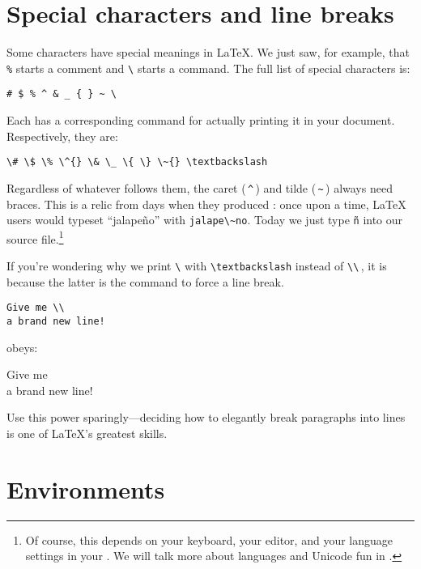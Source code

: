 \section{Special characters and line breaks}

Some characters have special meanings in \LaTeX.
We just saw, for example, that \verb|%| starts a comment
and \verb|\| starts a command.
The full list of special characters is:
\begin{leftfigure}
\begin{lstlisting}
# $ % ^ & _ { } ~ \
\end{lstlisting}
\end{leftfigure}
Each has a corresponding command
for actually printing it in your document. Respectively, they are:
\begin{leftfigure}
\begin{lstlisting}
\# \$ \% \^{} \& \_ \{ \} \~{} \textbackslash
\end{lstlisting}
\end{leftfigure}
Regardless of whatever follows them,
the caret (\,\texttt{\^{}}\,) and tilde (\,\texttt{\~{}}\,) always need braces.
This is a relic from days when they produced :
once upon a time, \LaTeX{} users would typeset ``jalapeño'' with
\verb|jalape\~no|.
Today we just type \texttt{ñ} into our source
file.\punckern\footnote{Of course, this depends
on your keyboard, your editor, and your language settings in your .
We will talk more about languages and Unicode fun in .}

If you're wondering why we print \texttt{\textbackslash} with
\verb|\textbackslash| instead of \verb|\\|\,,
it is because the latter is the command to force a line break.
\begin{leftfigure}
\begin{lstlisting}
Give me \\
a brand new line!
\end{lstlisting}
\end{leftfigure}
obeys:
\begin{leftfigure}
\lm Give me \\
a brand new line!
\end{leftfigure}
Use this power sparingly---deciding how to elegantly break paragraphs into
lines is one of \LaTeX{}'s greatest skills.

\section{Environments}

